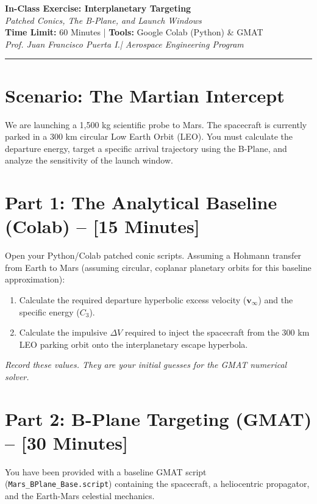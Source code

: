 \documentclass[11pt, letterpaper]{article}
\begin{document}
\begin{center}
    {\Large \textbf{In-Class Exercise: Interplanetary Targeting}} \\
    \vspace{0.2cm}
    {\large \textit{Patched Conics, The B-Plane, and Launch Windows}} \\
    \vspace{0.4cm}
    \textbf{Time Limit:} 60 Minutes | \textbf{Tools:} Google Colab (Python) \& GMAT \\
    \textit{Prof. Juan Francisco Puerta I.| Aerospace Engineering Program}
\end{center}

\hrule
\vspace{0.5cm}

\section*{Scenario: The Martian Intercept}
We are launching a 1,500 kg scientific probe to Mars. The spacecraft is currently parked in a 300 km circular Low Earth Orbit (LEO). You must calculate the departure energy, target a specific arrival trajectory using the B-Plane, and analyze the sensitivity of the launch window.

\section*{Part 1: The Analytical Baseline (Colab) -- [15 Minutes]}
Open your Python/Colab patched conic scripts. Assuming a Hohmann transfer from Earth to Mars (assuming circular, coplanar planetary orbits for this baseline approximation):
\begin{enumerate}
    \item Calculate the required departure hyperbolic excess velocity ($\boldsymbol{v}_\infty$) and the specific energy ($C_3$).
    \item Calculate the impulsive $\Delta V$ required to inject the spacecraft from the 300 km LEO parking orbit onto the interplanetary escape hyperbola.
\end{enumerate}
\textit{Record these values. They are your initial guesses for the GMAT numerical solver.}

\section*{Part 2: B-Plane Targeting (GMAT) -- [30 Minutes]}
You have been provided with a baseline GMAT script (\texttt{Mars\_BPlane\_Base.script}) containing the spacecraft, a heliocentric propagator, and the Earth-Mars celestial mechanics.
\end{document}
